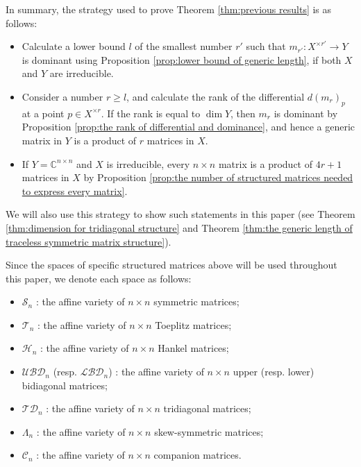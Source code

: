\documentclass[reqno]{amsart}
\theoremstyle{definition}
\numberwithin{equation}{section}
\begin{document}
In summary, the strategy used to prove Theorem \ref{thm:previous results} is as follows:
\begin{itemize}
    \item [Step 1)] Calculate a lower bound $l$ of the smallest number $r'$ such that $m_{r'}:X^{\times r'} \rightarrow Y$ is dominant using Proposition \ref{prop:lower bound of generic length}, if both $X$ and $Y$ are irreducible.
    \item [Step 2)] Consider a number $r \geq l$, and calculate the rank of the differential $d(m_{r})_p$ at a point $p \in X^{\times r}$. If the rank is equal to $\dim Y$, then $m_{r}$ is dominant by Proposition \ref{prop:the rank of differential and dominance}, and hence a generic matrix in $Y$ is a product of $r$ matrices in $X$.
    \item [Step 3)] If $Y=\mathbb{C}^{n \times n}$ and $X$ is irreducible, every $n \times n$ matrix is a product of $4r+1$ matrices in $X$ by Proposition \ref{prop:the number of structured matrices needed to express every matrix}.
\end{itemize}
We will also use this strategy to show such statements in this paper (see Theorem \ref{thm:dimension for tridiagonal structure} and Theorem \ref{thm:the generic length of traceless symmetric matrix structure}).

Since the spaces of specific structured matrices above will be used throughout this paper, we denote each space as follows:
\begin{itemize}
        \item [(\romannumeral1)] $\mathcal{S}_n$ : the affine variety of $n \times n$ symmetric matrices;
        \item [(\romannumeral2)] $\mathcal{T}_n$ : the affine variety of $n \times n$ Toeplitz matrices;
        \item [(\romannumeral3)] $\mathcal{H}_n$ : the affine variety of $n \times n$ Hankel matrices;
        \item [(\romannumeral4)] $\mathcal{UBD}_n$ (resp. $\mathcal{LBD}_n$) : the affine variety of $n \times n$ upper (resp. lower) bidiagonal matrices;
        \item [(\romannumeral5)] $\mathcal{TD}_n$ : the affine variety of $n \times n$ tridiagonal matrices;
        \item [(\romannumeral6)] $\Lambda_n$ : the affine variety of $n \times n$ skew-symmetric matrices;
        \item [(\romannumeral7)] $\mathcal{C}_n$ : the affine variety of $n \times n$ companion matrices.
\end{itemize}
\end{document}
